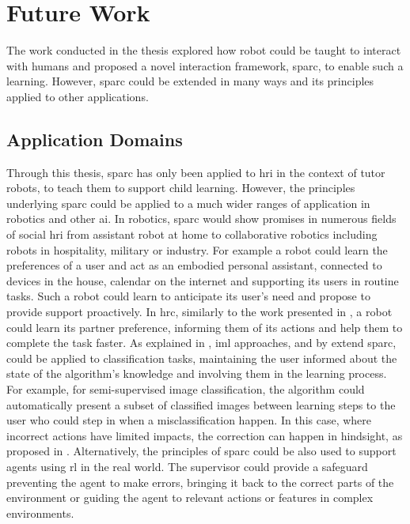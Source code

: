 \section{Future Work}

The work conducted in the thesis explored how robot could be taught to interact with humans and proposed a novel interaction framework, \gls{sparc}, to enable such a learning. However, \gls{sparc} could be extended in many ways and its principles applied to other applications.

\subsection{Application Domains}

Through this thesis, \gls{sparc} has only been applied to \gls{hri} in the context of tutor robots, to teach them to support child learning. However, the principles underlying \gls{sparc} could be applied to a much wider ranges of application in robotics and other \gls{ai}. In robotics, \gls{sparc} would show promises in numerous fields of social \gls{hri} from assistant robot at home to collaborative robotics including robots in hospitality, military or industry. For example a robot could learn the preferences of a user and act as an embodied personal assistant, connected to devices in the house, calendar on the internet and supporting its users in routine tasks. Such a robot could learn to anticipate its user's need and propose to provide support proactively. In \gls{hrc}, similarly to the work presented in \cite{munzer2017efficient}, a robot could learn its partner preference, informing them of its actions and help them to complete the task faster. As explained in \cite{feil2005defining}, \gls{iml} approaches, and by extend \gls{sparc}, could be applied to classification tasks, maintaining the user informed about the state of the algorithm's knowledge and involving them in the learning process. For example, for semi-supervised image classification, the algorithm could automatically present a subset of classified images between learning steps to the user who could step in when a misclassification happen. In this case, where incorrect actions have limited impacts, the correction can happen in hindsight, as proposed in \cite{chernova2009interactive}. Alternatively, the principles of \gls{sparc} could be also used to support agents using \gls{rl} in the real world. The supervisor could provide a safeguard preventing the agent to make errors, bringing it back to the correct parts of the environment or guiding the agent to relevant actions or features in complex environments.

